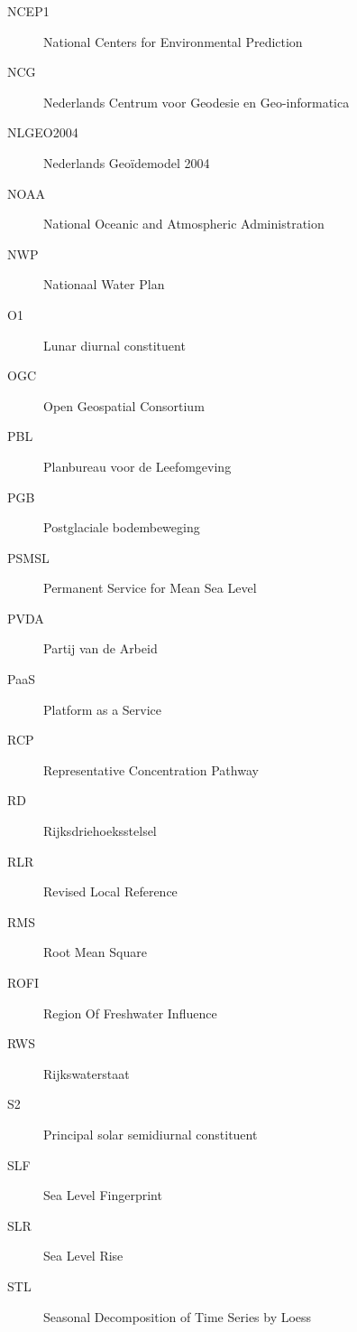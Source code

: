 \documentclass[ddraft]{deltares_report}
\begin{document}
\begin{description}
\item[\label{acronyms_NCEP1}{NCEP1}]
National Centers for Environmental Prediction
\item[\label{acronyms_NCG}{NCG}]
Nederlands Centrum voor Geodesie en Geo-informatica
\item[\label{acronyms_NLGEO2004}{NLGEO2004}]
Nederlands Geoïdemodel 2004
\item[\label{acronyms_NOAA}{NOAA}]
National Oceanic and Atmospheric Administration
\item[\label{acronyms_NWP}{NWP}]
Nationaal Water Plan
\item[\label{acronyms_O1}{O1}]
Lunar diurnal constituent
\item[\label{acronyms_OGC}{OGC}]
Open Geospatial Consortium
\item[\label{acronyms_PBL}{PBL}]
Planbureau voor de Leefomgeving
\item[\label{acronyms_PGB}{PGB}]
Postglaciale bodembeweging
\item[\label{acronyms_PSMSL}{PSMSL}]
Permanent Service for Mean Sea Level
\item[\label{acronyms_PVDA}{PVDA}]
Partij van de Arbeid
\item[\label{acronyms_PaaS}{PaaS}]
Platform as a Service
\item[\label{acronyms_RCP}{RCP}]
Representative Concentration Pathway
\item[\label{acronyms_RD}{RD}]
Rijksdriehoeksstelsel
\item[\label{acronyms_RLR}{RLR}]
Revised Local Reference
\item[\label{acronyms_RMS}{RMS}]
Root Mean Square
\item[\label{acronyms_ROFI}{ROFI}]
Region Of Freshwater Influence
\item[\label{acronyms_RWS}{RWS}]
Rijkswaterstaat
\item[\label{acronyms_S2}{S2}]
Principal solar semidiurnal constituent
\item[\label{acronyms_SLF}{SLF}]
Sea Level Fingerprint
\item[\label{acronyms_SLR}{SLR}]
Sea Level Rise
\item[\label{acronyms_STL}{STL}]
Seasonal Decomposition of Time Series by Loess

\end{description}
\end{document}
